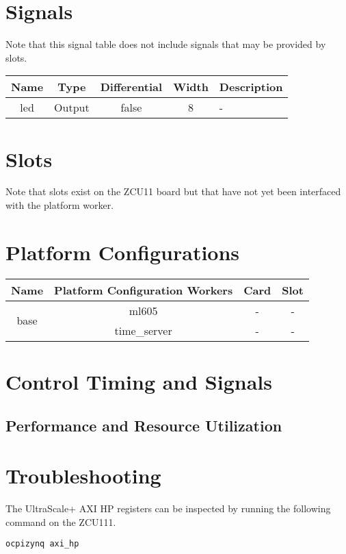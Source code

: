 \documentclass{article}
\edef\ecomp{zcu111}
\begin{document}
\section{Signals}
Note that this signal table does not include signals that may be provided by slots. \\
\begin{tabular}{|c|c|c|c|p{8cm}|}
	\hline
	\rowcolor{blue}
	Name           & Type   & Differential & Width & Description                                          \\
	\hline
	led            & Output & false        & 8    & -\\
	\hline
\end{tabular}
\section{Slots}
Note that slots exist on the ZCU11 board but that have not yet been interfaced with the platform worker.

\section{Platform Configurations}
	\begin{tabular}{|c|c|c|c|}
		\hline
		\rowcolor{blue}
		Name & Platform Configuration Workers & Card & Slot \\
		\hline
		\multirow{2}{*}{base} &ml605 & - & - \\ &time\_server & - & - \\
		\hline
	\end{tabular}

\section{Control Timing and Signals}

\begin{landscape}
\section{Performance and Resource Utilization}
%
\end{landscape}

\section{Troubleshooting}
The UltraScale+ AXI HP registers \cite{ultrascaleplus_registers_website} can be inspected by running the following command on the ZCU111.
\begin{lstlisting}
ocpizynq axi_hp
\end{lstlisting}
\end{document}
